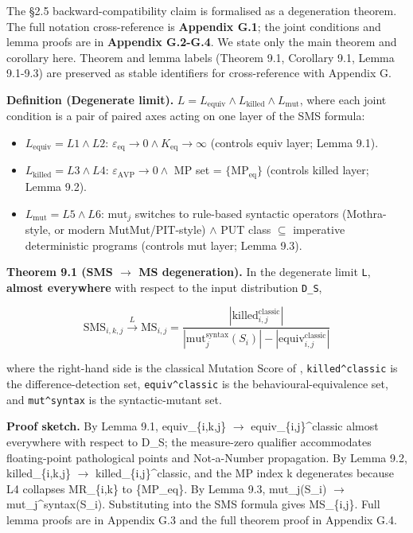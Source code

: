 \documentclass[acmsmall,screen,review]{acmart}
\providecommand{\tightlist}{\setlength{\itemsep}{0pt}\setlength{\parskip}{0pt}}
\begin{document}
The §2.5 backward-compatibility claim is formalised as a degeneration
theorem. The full notation cross-reference is \textbf{Appendix G.1}; the
joint conditions and lemma proofs are in \textbf{Appendix G.2-G.4}. We
state only the main theorem and corollary here. Theorem and lemma labels
(Theorem 9.1, Corollary 9.1, Lemma 9.1-9.3) are preserved as stable
identifiers for cross-reference with Appendix G.

\textbf{Definition (Degenerate limit).}
$L = L_{\mathrm{equiv}} \wedge L_{\mathrm{killed}} \wedge L_{\mathrm{mut}}$, where each joint
condition is a pair of paired axes acting on one layer of the SMS
formula:

\begin{itemize}
\tightlist
\item
  $L_{\mathrm{equiv}} = L1 \wedge L2$: $\varepsilon_{\mathrm{eq}} \to 0 \wedge K_{\mathrm{eq}} \to \infty$ (controls equiv
  layer; Lemma 9.1).
\item
  $L_{\mathrm{killed}} = L3 \wedge L4$: $\varepsilon_{\mathrm{AVP}} \to 0 \wedge$ MP set = $\{\mathrm{MP}_{\mathrm{eq}}\}$
  (controls killed layer; Lemma 9.2).
\item
  $L_{\mathrm{mut}} = L5 \wedge L6$: $\mathrm{mut}_j$ switches to rule-based syntactic
  operators (Mothra-style, or modern MutMut/PIT-style) $\wedge$ PUT class $\subseteq$ imperative deterministic
  programs (controls mut layer; Lemma 9.3).
\end{itemize}

\textbf{Theorem 9.1 (SMS $\to$ MS degeneration).} In the degenerate limit
\texttt{L}, \textbf{almost everywhere} with respect to the input
distribution \texttt{D\_S},

\[ \mathrm{SMS}_{i,k,j} \xrightarrow{L} \mathrm{MS}_{i,j} = \frac{|\mathrm{killed}_{i,j}^{\mathrm{classic}}|}{|\mathrm{mut}_j^{\mathrm{syntax}}(S_i)| - |\mathrm{equiv}_{i,j}^{\mathrm{classic}}|} \]

where the right-hand side is the classical Mutation Score of
\citet{d7c38286734419b52de4262c9802ebdfcf4b9447}, \texttt{killed\^{}classic} is the difference-detection
set, \texttt{equiv\^{}classic} is the behavioural-equivalence set, and
\texttt{mut\^{}syntax} is the syntactic-mutant set.

\textbf{Proof sketch.} By Lemma 9.1, equiv\_\{i,k,j\} $\to$
equiv\_\{i,j\}\^{}classic almost everywhere with respect to D\_S; the
measure-zero qualifier accommodates floating-point pathological points
and Not-a-Number propagation. By Lemma 9.2, killed\_\{i,k,j\} $\to$
killed\_\{i,j\}\^{}classic, and the MP index k degenerates because L4
collapses MR\_\{i,k\} to \{MP\_eq\}. By Lemma 9.3, mut\_j(S\_i) $\to$
mut\_j\^{}syntax(S\_i). Substituting into the SMS formula gives
MS\_\{i,j\}. Full lemma proofs are in Appendix G.3 and the full theorem
proof in Appendix G.4.
\end{document}
